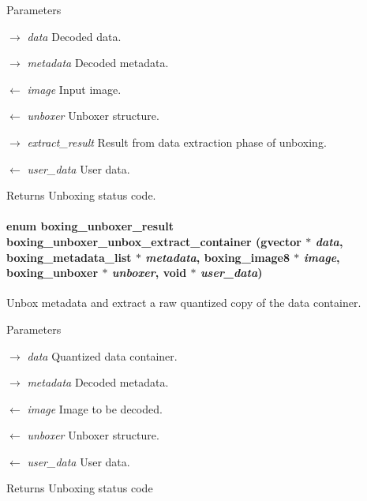 \begin{DoxyParams}{Parameters}
\item[\mbox{$\rightarrow$} {\em data}]Decoded data. \item[\mbox{$\rightarrow$} {\em metadata}]Decoded metadata. \item[\mbox{$\leftarrow$} {\em image}]Input image. \item[\mbox{$\leftarrow$} {\em unboxer}]Unboxer structure. \item[\mbox{$\rightarrow$} {\em extract\_\-result}]Result from data extraction phase of unboxing. \item[\mbox{$\leftarrow$} {\em user\_\-data}]User data. \end{DoxyParams}
\begin{DoxyReturn}{Returns}
Unboxing status code. 
\end{DoxyReturn}
\hypertarget{group__unboxer_gabdb1dfbc5aa0dc72aa2f75a62acb827d}{
\paragraph[{boxing\_\-unboxer\_\-unbox\_\-extract\_\-container}]{\setlength{\rightskip}{0pt plus 5cm}enum {\bf boxing\_\-unboxer\_\-result} boxing\_\-unboxer\_\-unbox\_\-extract\_\-container (gvector $\ast$ {\em data}, \/  boxing\_\-metadata\_\-list $\ast$ {\em metadata}, \/  boxing\_\-image8 $\ast$ {\em image}, \/  boxing\_\-unboxer $\ast$ {\em unboxer}, \/  void $\ast$ {\em user\_\-data})}\hfill}
\label{group__unboxer_gabdb1dfbc5aa0dc72aa2f75a62acb827d}
Unbox metadata and extract a raw quantized copy of the data container.


\begin{DoxyParams}{Parameters}
\item[\mbox{$\rightarrow$} {\em data}]Quantized data container. \item[\mbox{$\rightarrow$} {\em metadata}]Decoded metadata. \item[\mbox{$\leftarrow$} {\em image}]Image to be decoded. \item[\mbox{$\leftarrow$} {\em unboxer}]Unboxer structure. \item[\mbox{$\leftarrow$} {\em user\_\-data}]User data. \end{DoxyParams}
\begin{DoxyReturn}{Returns}
Unboxing status code 
\end{DoxyReturn}
